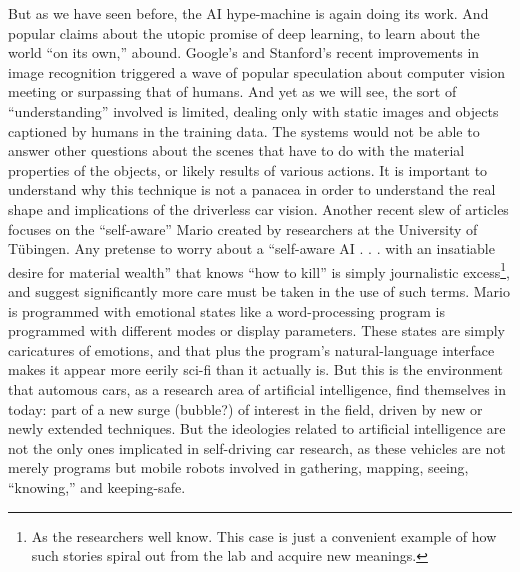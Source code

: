 But as we have seen before, the AI hype-machine is again doing its
work. And popular claims about the utopic promise of deep learning, to
learn about the world ``on its own,''
abound. Google's and Stanford's recent
improvements in image recognition\cite{markoffImage} triggered a wave
of popular speculation about computer vision meeting or surpassing
that of humans. And yet as we will see, the sort of ``understanding''
involved is limited, dealing only with static images and objects
captioned by humans in the training data. The systems would not be
able to answer other questions about the scenes that have to do with
the material properties of the objects, or likely results of various
actions.\cite{gomesJordan} It is important to understand why this technique is not a
panacea in order to understand the real shape and implications
of the driverless car vision. Another recent slew of articles focuses on
the ``self-aware'' Mario created by researchers at the University of
T\"{u}bingen. Any pretense to worry about a ``self-aware AI . . . with
an insatiable desire for material wealth'' that knows ``how to kill''\cite{vincentMario}
is simply journalistic excess\footnote{As the
  researchers well know. This case is just a convenient example of how
such stories spiral out from the lab and acquire new meanings.}, and suggest
significantly more care must be taken in the use of such terms. Mario
is programmed with emotional states like a word-processing program is
programmed with different modes or display parameters. These states
are simply caricatures of emotions, and that plus the program's
natural-language interface makes it appear more eerily sci-fi than it
actually is. But this is the environment that automous cars, as a
research area of artificial intelligence, find themselves in today:
part of a new surge (bubble?) of interest in the field, driven by new
or newly extended techniques. But the ideologies related to artificial
intelligence are not the only ones implicated in self-driving car
research, as these vehicles are not merely programs but mobile robots
involved in gathering, mapping, seeing, ``knowing,'' and keeping-safe.


